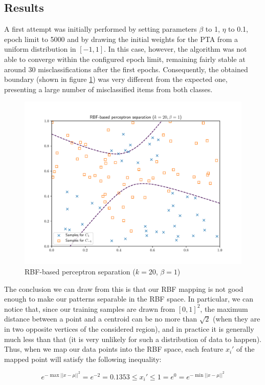 \documentclass[letterpaper,headings=standardclasses]{scrartcl}
\begin{document}
\subsection{Results}

A first attempt was initially performed by setting parameters $\beta$ to 1, $\eta$ to 0.1, epoch limit to 5000 and by drawing the initial weights for the PTA from a uniform distribution in $[-1, 1]$. In this case, however, the algorithm was not able to converge within the configured epoch limit, remaining fairly stable at around 30 misclassifications after the first epochs. Consequently, the obtained boundary (shown in figure \ref{sep_20_1}) was very different from the expected one, presenting a large number of misclassified items from both classes.

\begin{figure}[h]
    \centering
    \includegraphics[width=0.7\linewidth]{sep_20_1.pdf}
    \caption{RBF-based perceptron separation ($k = 20$, $\beta = 1$)}
    \label{sep_20_1}
\end{figure}

The conclusion we can draw from this is that our RBF mapping is not good enough to make our patterns separable in the RBF space. In particular, we can notice that, since our training samples are drawn from $[0,1]^2$, the maximum distance between a point and a centroid can be no more than $\sqrt{2}$ (when they are in two opposite vertices of the considered region), and in practice it is generally much less than that (it is very unlikely for such a distribution of data to happen). Thus, when we map our data points into the RBF space, each feature $x_i'$ of the mapped point will satisfy the following inequality:

$$ e^{-\max{||x - \mu||^2}} = e^{-2} = 0.1353 \le x_i' \le 1 = e^{0} = e^{-\min{||x - \mu||^2}} $$
\end{document}
